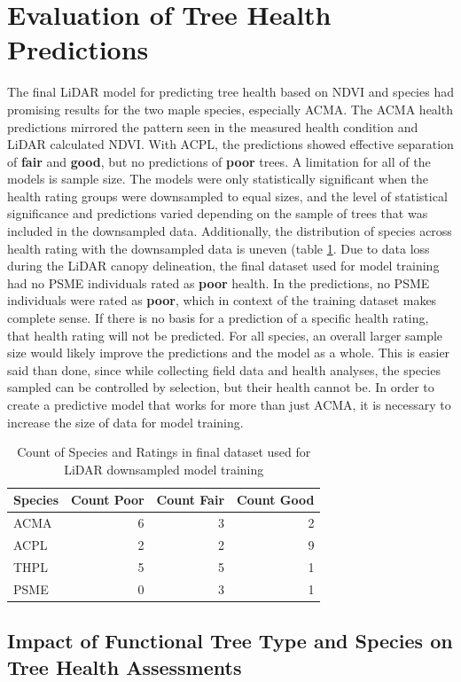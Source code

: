 \documentclass[12pt,twoside]{reedthesis}
\begin{document}
\hypertarget{evaluation-of-tree-health-predictions}{%
\section{Evaluation of Tree Health Predictions}\label{evaluation-of-tree-health-predictions}}

The final LiDAR model for predicting tree health based on NDVI and
species had promising results for the two maple species, especially
ACMA. The ACMA health predictions mirrored the pattern seen in the
measured health condition and LiDAR calculated NDVI. With ACPL, the
predictions showed effective separation of \textbf{fair} and \textbf{good}, but no
predictions of \textbf{poor} trees. A limitation for all of the models is
sample size. The models were only statistically significant when the
health rating groups were downsampled to equal sizes, and the level of
statistical significance and predictions varied depending on the sample
of trees that was included in the downsampled data. Additionally, the
distribution of species across health rating with the downsampled data
is uneven (table \ref{tab:species-counts-bleh}. Due to data loss during
the LiDAR canopy delineation, the final dataset used for model training
had no PSME individuals rated as \textbf{poor} health. In the predictions, no
PSME individuals were rated as \textbf{poor}, which in context of the
training dataset makes complete sense. If there is no basis for a
prediction of a specific health rating, that health rating will not be
predicted. For all species, an overall larger sample size would likely
improve the predictions and the model as a whole. This is easier said
than done, since while collecting field data and health analyses, the
species sampled can be controlled by selection, but their health cannot
be. In order to create a predictive model that works for more than just
ACMA, it is necessary to increase the size of data for model training.
\begin{table}

\caption{\label{tab:species-counts-bleh}Count of Species and Ratings in final dataset used for LiDAR downsampled model training}
\centering
\begin{tabular}[t]{lrrr}
\toprule
Species & Count Poor & Count Fair & Count Good\\
\midrule
ACMA & 6 & 3 & 2\\
ACPL & 2 & 2 & 9\\
THPL & 5 & 5 & 1\\
PSME & 0 & 3 & 1\\
\bottomrule
\end{tabular}
\end{table}
\hypertarget{impact-of-functional-tree-type-and-species-on-tree-health-assessments}{%
\subsection{Impact of Functional Tree Type and Species on Tree Health Assessments}\label{impact-of-functional-tree-type-and-species-on-tree-health-assessments}}
\end{document}
